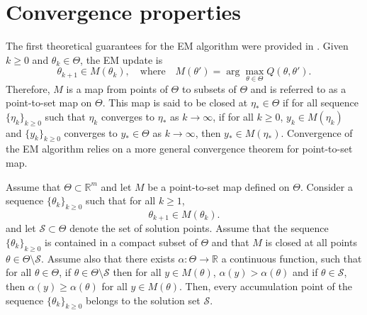 \documentclass[english,graybox,envcountchap,envcountsame,sectrefs,shortlabels]{svmono}
\theoremstyle{style}
\newcommand{\eqsp}{}
\begin{document}
\begin{algorithm}
\caption{A generic EM algorithm}\label{alg:EM}
\end{algorithm}




\section{Convergence properties}

The first theoretical guarantees for the EM algorithm were provided in \cite{wu1983convergence}. Given $k\geq 0$ and $\theta_k\in\Theta$, the EM update is
\[
\theta_{k+1} \in M(\theta_k),
\quad \text{where} \quad
M(\theta') = \arg\max_{\theta \in \Theta} Q(\theta,\theta').
\]
Therefore, $M$ is a  map from points of $\Theta$ to subsets of $\Theta$ and is referred to as a point-to-set map on $\Theta$. This map is said to be closed at $\eta_*\in\Theta$ if for all sequence $\{\eta_k\}_{k\geq 0 }$ such that $\eta_k$ converges to $\eta_*$ as $k \to \infty$, if for all $k\geq 0$, $y_k\in M(\eta_k)$ and  $\{y_k\}_{k\geq 0 }$ converges to $y_*\in\Theta$ as $k \to \infty$, then $y_* \in M(\eta_*)$. Convergence of the EM algorithm relies on a more general convergence theorem for point-to-set map.


\begin{theorem}
\label{th:zangwill:conv}
Assume that  $\Theta \subset \mathbb{R}^m$ and let $M$ be a point-to-set map defined on $\Theta$.
Consider a sequence $\{\theta_k\}_{k\geq 0}$ such that for all $k\geq 1$,
\[
\theta_{k+1} \in M(\theta_k)\eqsp.
\]
 and let $\mathcal{S} \subset \Theta$
denote the set of solution points. Assume that the sequence  $\{\theta_k\}_{k\geq 0}$ is contained in a compact subset of $\Theta$ and that $M$ is closed at all points $\theta \in \Theta \setminus \mathcal{S}$. Assume also that there exists $\alpha : \Theta \to \mathbb{R}$ a continuous function, such that for all $\theta \in \Theta$,  if $\theta\in\Theta\setminus \mathcal{S}$ then for all $y \in M(\theta)$, $\alpha(y) > \alpha(\theta)$ and if $\theta\in \mathcal{S}$, then $ \alpha(y) \ge \alpha(\theta)$ for all $y \in M(\theta)$. Then, every accumulation point of the sequence $\{\theta_k\}_{k\geq 0}$ belongs to the solution set $\mathcal{S}$.
\end{theorem}
\end{document}
